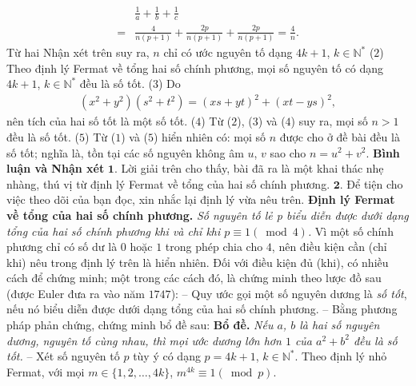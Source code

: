 \begin{multicols}{2}
	\begin{align*}
		&\frac{1}{a} + \frac{1}{b} + \frac{1}{c} \\
		= &\frac{4}{{n\left( {p + 1} \right)}} + \frac{{2p}}{{n\left( {p + 1} \right)}} + \frac{{2p}}{{n\left( {p + 1} \right)}} = \frac{4}{n}.
	\end{align*}
	Từ hai Nhận xét trên suy ra, $n$ chỉ có ước nguyên tố dạng $4k + 1$, $k \in \mathbb{N^*}$  \hfill        ($2$)
	\vskip 0.05cm
	Theo định lý Fermat về tổng hai số chính phương, mọi số nguyên tố có dạng $4k + 1$, $k \in \mathbb{N^*}$  đều là số tốt. \hfill ($3$)
	\vskip 0.05cm
	Do
	\begin{align*}
		\left( {{x^2} + {y^2}} \right)\!\!\left( {{s^2} + {t^2}} \right) \!=\! {\left( {xs + yt} \right)^2} \!+\! {\left( {xt - ys} \right)^2},
	\end{align*}
	nên tích của hai số tốt là một số tốt. \hfill ($4$)
	\vskip 0.05cm
	Từ ($2$), ($3$) và ($4$) suy ra, mọi số $n > 1$ đều là số tốt. ($5$)
	\vskip 0.05cm
	Từ ($1$) và ($5$) hiển nhiên có: mọi số $n$ được cho ở đề bài đều là số tốt; nghĩa là, tồn tại các số nguyên không âm $u$, $v$ sao cho $n = u^2 + v^2$.
	\vskip 0.05cm 
	\textbf{\color{thachthuctoanhoc}Bình luận và Nhận xét}
	\vskip 0.05cm
	$\pmb{1.}$ Lời giải trên cho thấy, bài đã ra là một khai thác nhẹ nhàng, thú vị từ định lý Fermat về tổng của hai số chính phương.
	\vskip 0.05cm
	$\pmb{2.}$ Để tiện cho việc theo dõi của bạn đọc, xin nhắc lại định lý vừa nêu trên.
	\vskip 0.05cm
	\textbf{\color{thachthuctoanhoc}Định lý Fermat về tổng của hai số chính phương.} \textit{Số nguyên tố lẻ p biểu diễn được dưới dạng tổng của hai số chính phương khi và chỉ khi $p \equiv 1\left( {\bmod 4} \right)$.}
	\vskip 0.05cm 
	Vì một số chính phương chỉ có số dư là $0$ hoặc $1$ trong phép chia cho $4$, nên điều kiện cần (chỉ khi) nêu trong định lý trên là hiển nhiên.
	\vskip 0.05cm
	Đối với điều kiện đủ (khi), có nhiều cách để chứng minh; một trong các cách đó, là chứng minh theo lược đồ sau (được Euler đưa ra vào năm $1747$):
	\vskip 0.05cm
	-- Quy ước gọi một số nguyên dương là \textit{số tốt}, nếu nó biểu diễn được dưới dạng tổng của hai số chính phương.
	\vskip 0.05cm
	-- Bằng phương pháp phản chứng, chứng minh bổ đề sau:
	\vskip 0.05cm
	\textbf{\color{thachthuctoanhoc}Bổ đề.} \textit{Nếu $a$, $b$ là hai số nguyên dương, nguyên tố cùng nhau, thì mọi ước dương lớn hơn $1$ của $a^2 + b^2$  đều là số tốt.}
	\vskip 0.05cm
	-- Xét số nguyên tố $p$ tùy ý có dạng $p = 4k + 1$, $k \in \mathbb{N^*}$.
	\vskip 0.05cm  
	Theo định lý nhỏ Fermat, với mọi $m \in \{1, 2, \ldots, 4k\}$, ${m^{4k}} \equiv 1\left( {\bmod p} \right)$.

\end{multicols}

